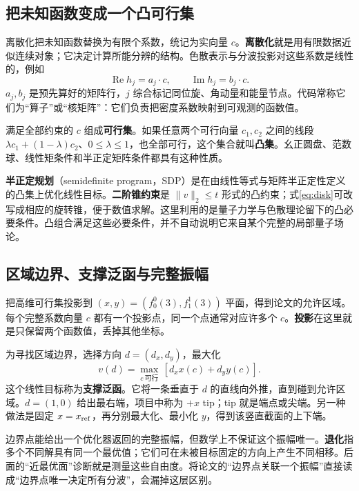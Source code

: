 \documentclass[UTF8,a4paper,11pt,fontset=fandol]{ctexart}
\numberwithin{equation}{section}
\newcommand{\Ree}{\operatorname{Re}}
\newcommand{\Imm}{\operatorname{Im}}
\begin{document}
\subsection{把未知函数变成一个凸可行集}
离散化把未知函数替换为有限个系数，统记为实向量 \(c\)。\textbf{离散化}就是用有限数据近似连续对象；它决定计算所能分辨的结构。色散表示与分波投影对这些系数是线性的，例如
\begin{equation}
\Ree h_j=a_j\cdot c,\qquad \Imm h_j=b_j\cdot c.
\end{equation}
\(a_j,b_j\) 是预先算好的矩阵行，\(j\) 综合标记同位旋、角动量和能量节点。代码常称它们为“算子”或“核矩阵”：它们负责把密度系数映射到可观测的函数值。

满足全部约束的 \(c\) 组成\textbf{可行集}。如果任意两个可行向量 \(c_1,c_2\) 之间的线段 \(\lambda c_1+(1-\lambda)c_2\)、\(0\le\lambda\le1\)，也全部可行，这个集合就叫\textbf{凸集}。幺正圆盘、范数球、线性矩条件和半正定矩阵条件都具有这种性质。

\textbf{半正定规划}（semidefinite program，SDP）是在由线性等式与矩阵半正定性定义的凸集上优化线性目标。\textbf{二阶锥约束}是 \(\|v\|_2\le t\) 形式的凸约束；式\eqref{eq:disk}可改写成相应的旋转锥，便于数值求解。这里利用的是量子力学与色散理论留下的凸必要条件。凸组合满足这些必要条件，并不自动说明它来自某个完整的局部量子场论。

\subsection{区域边界、支撑泛函与完整振幅}
把高维可行集投影到 \((x,y)=(f_0^0(3),f_1^1(3))\) 平面，得到论文的允许区域。每个完整系数向量 \(c\) 都有一个投影点，同一个点通常对应许多个 \(c\)。\textbf{投影}在这里就是只保留两个函数值，丢掉其他坐标。

为寻找区域边界，选择方向 \(d=(d_x,d_y)\)，最大化
\begin{equation}\label{eq:support}
v(d)=\max_{c\ \text{可行}}\,[d_x x(c)+d_y y(c)].
\end{equation}
这个线性目标称为\textbf{支撑泛函}。它将一条垂直于 \(d\) 的直线向外推，直到碰到允许区域。\(d=(1,0)\) 给出最右端，项目中称为 \(+x\) tip；tip 就是端点或尖端。另一种做法是固定 \(x=x_{\rm ref}\)，再分别最大化、最小化 \(y\)，得到该竖直截面的上下端。

边界点能给出一个优化器返回的完整振幅，但数学上不保证这个振幅唯一。\textbf{退化}指多个不同解具有同一个最优值；它们可在未被目标固定的方向上产生不同相移。后面的“近最优面”诊断就是测量这些自由度。将论文的“边界点关联一个振幅”直接读成“边界点唯一决定所有分波”，会漏掉这层区别。
\end{document}
